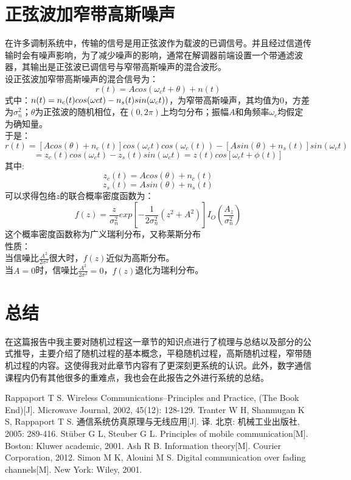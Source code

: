 \documentclass[12pt,a4paper,oneside]{ctexart}
\begin{document}
\section{正弦波加窄带高斯噪声}
在许多调制系统中，传输的信号是用正弦波作为载波的已调信号。并且经过信道传输时会有噪声影响，为了减少噪声的影响，通常在解调器前端设置一个带通滤波器，其输出是正弦波已调信号与窄带高斯噪声的混合波形。\\
设正弦波加窄带高斯噪声的混合信号为：
$$
    r(t) = Acos(\omega_{c}t + \theta ) + n(t)
$$
式中：$n(t) = n_{c}(t)cos(\omega\-{c}t) - n_{s}(t)sin(\omega_{c}t))$，为窄带高斯噪声，其均值为0，方差为$\sigma^{2}_{n}$；$\theta$为正弦波的随机相位，在$(0,2\pi)$上均匀分布；振幅$A$和角频率$\omega_{c}$均假定为确知量。\\
于是：
$$
    r(t) = \left[Acos(\theta) + n_{c}(t)\right]cos(\omega_{c}t)cos(\omega_{c}(t)) - \left[Asin(\theta) + n_{s}(t)\right]sin(\omega_{c}t)
$$
$$
     = z_{c}(t)cos(\omega_{c}t) - z_{s}(t)sin(\omega_{c}t) = z(t)cos\left[\omega_{c}t + \phi(t)\right]
$$
其中:
$$
    z_{c}(t) = Acos(\theta) + n_{c}(t)
$$
$$
    z_{s}(t) = Asin(\theta) + n_{s}(t)
$$
可以求得包络$z$的联合概率密度函数为：
$$
    f(z) = \frac{z}{\sigma^{2}_{n}}exp\left[-\frac{1}{2\sigma^{2}_{n}}(z^{2} + A^{2})\right]I_{O}(\frac{A_{z}}{\sigma^{2}_{n}})
$$
这个概率密度函数称为广义瑞利分布，又称莱斯分布\\
性质：\\
当信噪比$\frac{A^{2}}{2\sigma^{2}}$很大时，$f(z)$近似为高斯分布。\\
当$A=0$时，信噪比$\frac{A^{2}}{2\sigma^{2}} = 0$，$f(z)$退化为瑞利分布。
\section{总结}
在这篇报告中我主要对随机过程这一章节的知识点进行了梳理与总结以及部分的公式推导，主要介绍了随机过程的基本概念，平稳随机过程，高斯随机过程，窄带随机过程的内容。这使得我对此章节内容有了更深刻更系统的认识。此外，数字通信课程内仍有其他很多的重难点，我也会在此报告之外进行系统的总结。
\begin{thebibliography}{99}  
    Rappaport T S. Wireless Communications--Principles and Practice, (The Book End)[J]. Microwave Journal, 2002, 45(12): 128-129.
    Tranter W H, Shanmugan K S, Rappaport T S. 通信系统仿真原理与无线应用[J]. 译. 北京: 机械工业出版社, 2005: 289-416.
    Stüber G L, Steuber G L. Principles of mobile communication[M]. Boston: Kluwer academic, 2001.
    Ash R B. Information theory[M]. Courier Corporation, 2012.
    Simon M K, Alouini M S. Digital communication over fading channels[M]. New York: Wiley, 2001.
\end{thebibliography}
\end{document}
